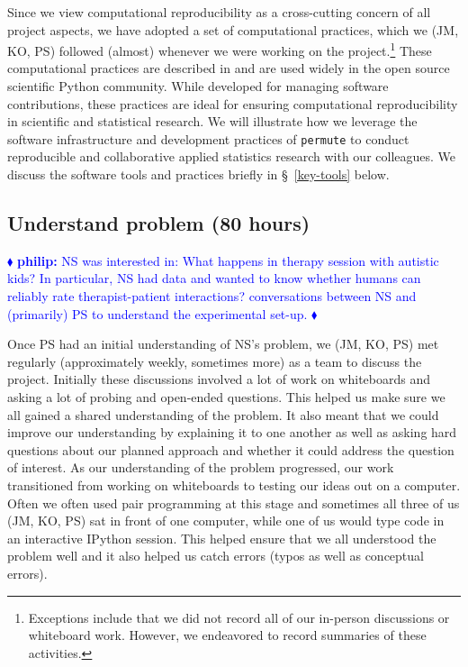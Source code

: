 \documentclass[]{article}
\newcommand{\philip}[1] { \textcolor{blue} {
\ensuremath{\blacklozenge} {\bf philip:}  {#1}
\ensuremath{\blacklozenge} } }
\begin{document}
Since we view computational reproducibility as a cross-cutting concern of all
project aspects, we have adopted a set of computational practices, which we
(JM, KO, PS) followed (almost) whenever we were working on the
project.\footnote{Exceptions include that we did not record all of our
in-person discussions or whiteboard work.  
However, we endeavored to
record summaries of these activities.}
These computational practices are described in \citet{millman2014developing}
and are used widely in the open source scientific Python community.
While developed for managing software contributions, these practices are ideal
for ensuring computational reproducibility in scientific and statistical
research.
We will illustrate how we leverage the software infrastructure and development
practices of \texttt{permute} to conduct reproducible and collaborative applied
statistics research with our colleagues.
We discuss the software tools and practices briefly in \S~\ref{key-tools} below.

\subsection{Understand problem (80 hours)}

\philip{
NS was interested in:  What happens in therapy session with autistic kids?
In particular, NS had data and wanted to know whether humans can reliably rate
therapist-patient interactions?
conversations between NS and (primarily) PS to understand the experimental
set-up.
}

Once PS had an initial understanding of NS's problem, we (JM, KO, PS) met
regularly (approximately weekly, sometimes more) as a team to discuss the
project.
Initially these discussions involved a lot of work on whiteboards and asking a
lot of probing and open-ended questions.
This helped us make sure we all gained a shared understanding of the problem.
It also meant that we could improve our understanding by explaining it to one
another as well as asking hard questions about our planned approach and whether
it could address the question of interest.
As our understanding of the problem progressed, our work transitioned from
working on whiteboards to testing our ideas out on a computer.
Often we often used pair programming at this stage and sometimes all three of
us (JM, KO, PS) sat in front of one computer, while one of us would type code
in an interactive IPython session.
This helped ensure that we all understood the problem well and it also helped
us catch errors (typos as well as conceptual errors).
\end{document}
